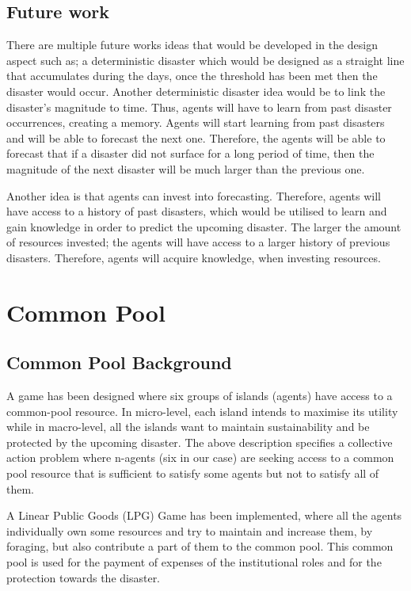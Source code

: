 \subsection{Future work}

There are multiple future works ideas that would be developed in the design aspect such as; a deterministic disaster which would be  designed as a straight line that accumulates during the days, once the threshold has been met then the disaster would occur. Another deterministic disaster idea would be to link the disaster’s magnitude to time. Thus, agents will have to learn from past disaster occurrences, creating a memory. Agents will start learning from past disasters and will be able to forecast the next one. Therefore, the agents will be able to forecast that if a disaster did not surface for a long period of time, then the magnitude of the next disaster will be much larger than the previous one.

Another idea is that agents can invest into forecasting. Therefore, agents will have access to a history of past disasters, which would be utilised to learn and gain knowledge in order to predict the upcoming disaster. The larger the amount of resources invested; the agents will have access to a larger history of previous disasters. Therefore, agents will acquire knowledge, when investing resources.

\section{Common Pool}
\subsection{Common Pool Background}

A game has been designed where six groups of islands (agents) have access to a common-pool resource. In micro-level, each island intends to maximise its utility while in macro-level, all the islands want to maintain sustainability and be protected by the upcoming disaster. The above description specifies a collective action problem where n-agents (six in our case) are seeking access to a common pool resource that is sufficient to satisfy some agents but not to satisfy all of them.

A Linear Public Goods (LPG) Game has been implemented, where all the agents individually own some resources and try to maintain and increase them, by foraging, but also contribute a part of them to the common pool. This common pool is used for the payment of expenses of the institutional roles and for the protection towards the disaster.

